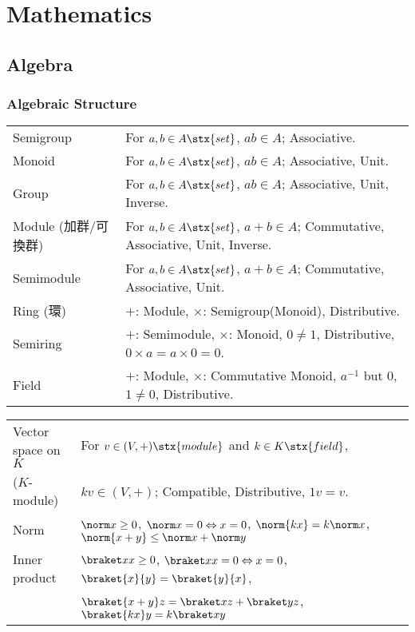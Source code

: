 
\newcommand{\Hom}{\mathop{\mathrm{Hom}}}
\section{Mathematics}
\subsection{Algebra}
\subsubsection{Algebraic Structure}
\begin{tabular}{l@{ :\ \ \ }l}
Semigroup     & For $a,b\in A\stx{set}$, $ab\in A$; Associative.\\
Monoid        & For $a,b\in A\stx{set}$, $ab\in A$; Associative, Unit.\\
Group         & For $a,b\in A\stx{set}$, $ab\in A$; Associative, Unit, Inverse.\\
Module {\tiny (加群/可換群)}
              & For $a,b\in A\stx{set}$, $a+b\in A$; Commutative, Associative, Unit, Inverse.\\
Semimodule    & For $a,b\in A\stx{set}$, $a+b\in A$; Commutative, Associative, Unit.\\
Ring   {\tiny (環)}
              & $+$: Module, $\times$: Semigroup{\footnotesize (Monoid)}, Distributive.\\
Semiring      & $+$: Semimodule, $\times$: Monoid, $0\neq1$, Distributive, $0\times a = a\times 0 = 0$.\\
Field         & $+$: Module, $\times$: Commutative Monoid, $a^{-1}$ but $0$, $1\neq0$, Distributive.
\end{tabular}

\vspace{.5zw}

\begin{tabular}{l@{ :\ \ \ }l}
Vector space on $K$  & For $v\in(V,+)\stx{module}$ and $k\in K\stx{field}$,\\
\hfill ($K$-module)  & \qquad $k v\in (V,+)$; Compatible, Distributive, $1v=v$.\\
Norm &
    $\norm x\ge0$, $\norm x=0\Leftrightarrow x=0$, $\norm{kx}=k\norm x$,
    $\norm{x+y}\le \norm x+\norm y$\\
Inner product & $\braket xx\ge0$, $\braket xx=0\Leftrightarrow x=0$,$\braket{x}{y}=\braket{y}{x}$,\\
              & \qquad $\braket{x+y}z=\braket xz + \braket yz$, $\braket{kx}y =k\braket xy$

\end{tabular}

